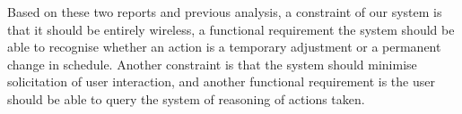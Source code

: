 Based on these two reports and previous analysis, a constraint of our system is that it should be entirely wireless, a functional requirement the system should be able to recognise whether an action is a temporary adjustment or a permanent change in schedule. Another constraint is that the system should minimise solicitation of user interaction, and another functional requirement is the user should be able to query the system of reasoning of actions taken.
